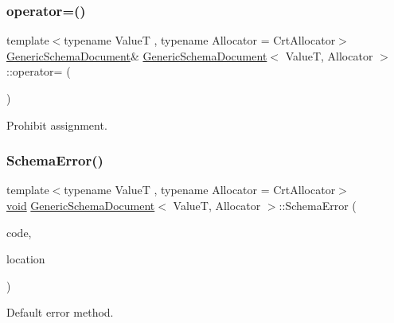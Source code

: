 \subsubsection{\texorpdfstring{operator=()}{operator=()}}
{\footnotesize\ttfamily template$<$typename ValueT , typename Allocator  = Crt\+Allocator$>$ \\
\hyperlink{classGenericSchemaDocument}{Generic\+Schema\+Document}\& \hyperlink{classGenericSchemaDocument}{Generic\+Schema\+Document}$<$ ValueT, Allocator $>$\+::operator= (\begin{DoxyParamCaption}\item[{const \hyperlink{classGenericSchemaDocument}{Generic\+Schema\+Document}$<$ ValueT, Allocator $>$ \&}]{ }\end{DoxyParamCaption})\hspace{0.3cm}{\ttfamily [private]}}



Prohibit assignment. 

\mbox{\label{classGenericSchemaDocument_a78661bc8f6e235a06f803e8d53e823c2}} 
\subsubsection{\texorpdfstring{Schema\+Error()}{SchemaError()}}
{\footnotesize\ttfamily template$<$typename ValueT , typename Allocator  = Crt\+Allocator$>$ \\
\hyperlink{imgui__impl__opengl3__loader_8h_ac668e7cffd9e2e9cfee428b9b2f34fa7}{void} \hyperlink{classGenericSchemaDocument}{Generic\+Schema\+Document}$<$ ValueT, Allocator $>$\+::Schema\+Error (\begin{DoxyParamCaption}\item[{const \hyperlink{group__RAPIDJSON__ERRORS_ga64f496d2cee8c9673f3105ec6008f290}{Schema\+Error\+Code}}]{code,  }\item[{const \hyperlink{classGenericSchemaDocument_aeb62f562d4dc024402b00f97cbcef747}{Pointer\+Type} \&}]{location }\end{DoxyParamCaption})\hspace{0.3cm}{\ttfamily [inline]}}



Default error method. 

\mbox{\label{classGenericSchemaDocument_aff66d9c52fad15e3bba4e5743598ab71}} 
